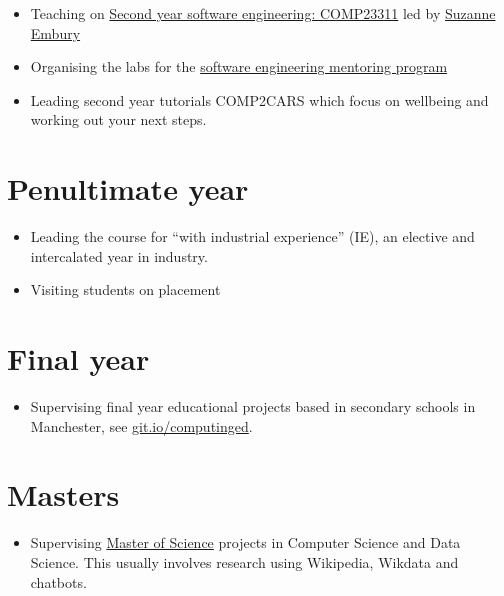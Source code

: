 \documentclass[12pt,]{book}
\providecommand{\tightlist}{%
  \setlength{\itemsep}{0pt}\setlength{\parskip}{0pt}}
\begin{document}
\begin{itemize}
\tightlist
\item
  Teaching on \href{https://studentnet.cs.manchester.ac.uk/ugt/COMP23311/syllabus/}{Second year software engineering: COMP23311} led by \href{http://www.cs.man.ac.uk/~embury/}{Suzanne Embury}
\item
  Organising the labs for the \href{https://www.cs.manchester.ac.uk/connect/business-engagement/industrial-mentoring/}{software engineering mentoring program}
\item
  Leading second year tutorials COMP2CARS which focus on wellbeing and working out your next steps.
\end{itemize}

\hypertarget{penultimate-year}{%
\section{Penultimate year}\label{penultimate-year}}

\begin{itemize}
\tightlist
\item
  Leading the course for ``with industrial experience'' (IE), an elective and intercalated year in industry.
\item
  Visiting students on placement
\end{itemize}

\hypertarget{final-year}{%
\section{Final year}\label{final-year}}

\begin{itemize}
\tightlist
\item
  Supervising final year educational projects based in secondary schools in Manchester, see \href{https://git.io/computinged}{git.io/computinged}.
\end{itemize}

\hypertarget{masters}{%
\section{Masters}\label{masters}}

\begin{itemize}
\tightlist
\item
  Supervising \href{https://www.cs.manchester.ac.uk/study/masters/}{Master of Science} projects in Computer Science and Data Science. This usually involves research using Wikipedia, Wikdata and chatbots. 🤖
\end{itemize}
\end{document}
